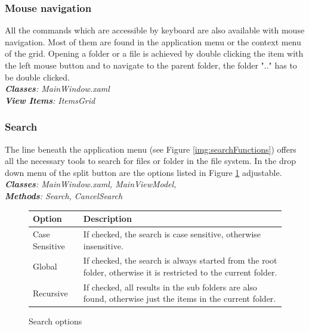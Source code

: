 \documentclass[JCDReport.tex]{subfiles}
\begin{document}
\subsubsection{Mouse navigation}
All the commands which are accessible by keyboard are also available with mouse navigation.
Most of them are found in the application menu or the context menu of the grid. Opening a folder or a file is achieved by double clicking the item with the left mouse button and to navigate to the parent folder, the folder ".." has to be double clicked. \\
\textit{\textbf{Classes}: MainWindow.xaml\\
\textbf{View Items}: ItemsGrid}

\subsubsection{Search}	
The line beneath the application menu (see Figure \ref{img:searchFunctions}) offers all the necessary tools to search for files or folder in the file system. In the drop down menu of the split button are the options listed in Figure \ref{tbl:searchOptions} adjustable.\\
\textit{\textbf{Classes}: MainWindow.xaml, MainViewModel, \\
\textbf{Methods}: Search, CancelSearch}

\begin{figure}[h!]
	\centering
	\begin{tabular}{| l | p{10cm} |}
		\hline
		\textbf{Option} & \textbf{Description} \\ \hline \hline
		Case Sensitive & If checked, the search is case sensitive, otherwise insensitive. \\ \hline
		Global & If checked, the search is always started from the root folder, otherwise it is restricted to the current folder. \\ \hline
		Recursive & If checked, all results in the sub folders are also found, otherwise just the items in the current folder. \\ \hline
		\end{tabular}
	\caption{Search options}
	\label{tbl:searchOptions}
\end{figure}
\end{document}
